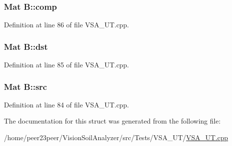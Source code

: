 \subsubsection[{comp}]{\setlength{\rightskip}{0pt plus 5cm}Mat B\+::comp}\label{struct_b_a255bb9e995f9115cb12fef9911dcfc2e}


Definition at line 86 of file V\+S\+A\+\_\+\+U\+T.\+cpp.

\hypertarget{struct_b_a42c8a8a887d60baf5cad68219df40aa3}{}
\subsubsection[{dst}]{\setlength{\rightskip}{0pt plus 5cm}Mat B\+::dst}\label{struct_b_a42c8a8a887d60baf5cad68219df40aa3}


Definition at line 85 of file V\+S\+A\+\_\+\+U\+T.\+cpp.

\hypertarget{struct_b_a678f871ba71d1e313ef4f02c72daff60}{}
\subsubsection[{src}]{\setlength{\rightskip}{0pt plus 5cm}Mat B\+::src}\label{struct_b_a678f871ba71d1e313ef4f02c72daff60}


Definition at line 84 of file V\+S\+A\+\_\+\+U\+T.\+cpp.



The documentation for this struct was generated from the following file\+:\begin{DoxyCompactItemize}
\item 
/home/peer23peer/\+Vision\+Soil\+Analyzer/src/\+Tests/\+V\+S\+A\+\_\+\+U\+T/\hyperlink{_v_s_a___u_t_8cpp}{V\+S\+A\+\_\+\+U\+T.\+cpp}\end{DoxyCompactItemize}

